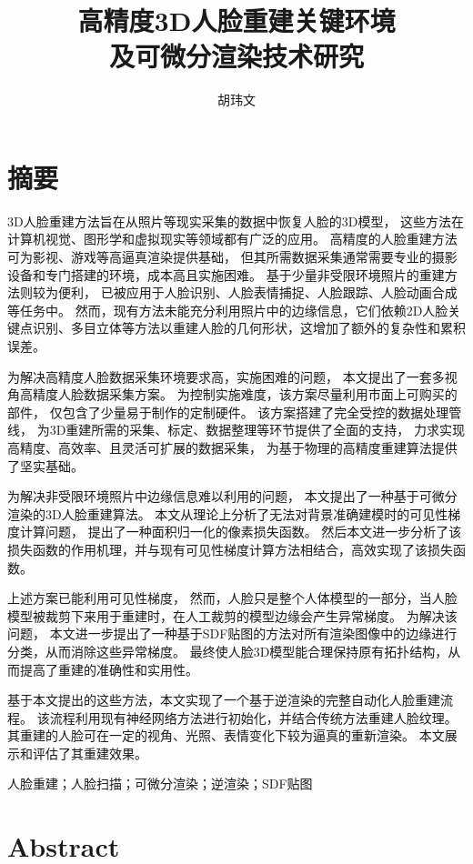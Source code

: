 \documentclass{scutmaster}
\title{高精度3D人脸重建关键环境\texorpdfstring{\\}{}及可微分渲染技术研究}
\date{\zhtoday}
\author{胡玮文}
\begin{document}
\maketitle
\hideinblind{
    \maketitleEN
    \nominationpage
    \declareoforiginality
}

\frontmatter
\chapter{摘\texorpdfstring{\quad}{}要}

3D人脸重建方法旨在从照片等现实采集的数据中恢复人脸的3D模型，
这些方法在计算机视觉、图形学和虚拟现实等领域都有广泛的应用。
高精度的人脸重建方法可为影视、游戏等高逼真渲染提供基础，
但其所需数据采集通常需要专业的摄影设备和专门搭建的环境，成本高且实施困难。
基于少量非受限环境照片的重建方法则较为便利，
已被应用于人脸识别、人脸表情捕捉、人脸跟踪、人脸动画合成等任务中。
然而，现有方法未能充分利用照片中的边缘信息，它们依赖2D人脸关键点识别、多目立体等方法以重建人脸的几何形状，这增加了额外的复杂性和累积误差。

为解决高精度人脸数据采集环境要求高，实施困难的问题，
本文提出了一套多视角高精度人脸数据采集方案。
为控制实施难度，该方案尽量利用市面上可购买的部件，
仅包含了少量易于制作的定制硬件。
该方案搭建了完全受控的数据处理管线，
为3D重建所需的采集、标定、数据整理等环节提供了全面的支持，
力求实现高精度、高效率、且灵活可扩展的数据采集，
为基于物理的高精度重建算法提供了坚实基础。

为解决非受限环境照片中边缘信息难以利用的问题，
本文提出了一种基于可微分渲染的3D人脸重建算法。
本文从理论上分析了无法对背景准确建模时的可见性梯度计算问题，
提出了一种面积归一化的像素损失函数。
然后本文进一步分析了该损失函数的作用机理，并与现有可见性梯度计算方法相结合，高效实现了该损失函数。

上述方案已能利用可见性梯度，
然而，人脸只是整个人体模型的一部分，当人脸模型被裁剪下来用于重建时，在人工裁剪的模型边缘会产生异常梯度。
为解决该问题，
本文进一步提出了一种基于SDF贴图的方法对所有渲染图像中的边缘进行分类，从而消除这些异常梯度。
最终使人脸3D模型能合理保持原有拓扑结构，从而提高了重建的准确性和实用性。

基于本文提出的这些方法，本文实现了一个基于逆渲染的完整自动化人脸重建流程。
该流程利用现有神经网络方法进行初始化，并结合传统方法重建人脸纹理。
其重建的人脸可在一定的视角、光照、表情变化下较为逼真的重新渲染。
本文展示和评估了其重建效果。

 人脸重建；人脸扫描；可微分渲染；逆渲染；SDF贴图

\chapter{Abstract}
\end{document}
